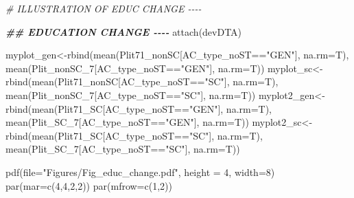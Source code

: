 \documentclass[
]{article}
\newenvironment{Shaded}{\begin{snugshade}}{\end{snugshade}}
\newcommand{\AttributeTok}[1]{\textcolor[rgb]{0.77,0.63,0.00}{#1}}
\newcommand{\CommentTok}[1]{\textcolor[rgb]{0.56,0.35,0.01}{\textit{#1}}}
\newcommand{\DecValTok}[1]{\textcolor[rgb]{0.00,0.00,0.81}{#1}}
\newcommand{\DocumentationTok}[1]{\textcolor[rgb]{0.56,0.35,0.01}{\textbf{\textit{#1}}}}
\newcommand{\FunctionTok}[1]{\textcolor[rgb]{0.00,0.00,0.00}{#1}}
\newcommand{\NormalTok}[1]{#1}
\newcommand{\OtherTok}[1]{\textcolor[rgb]{0.56,0.35,0.01}{#1}}
\newcommand{\SpecialCharTok}[1]{\textcolor[rgb]{0.00,0.00,0.00}{#1}}
\newcommand{\StringTok}[1]{\textcolor[rgb]{0.31,0.60,0.02}{#1}}
\begin{document}
\begin{Shaded}
\begin{Highlighting}[]
\CommentTok{\# ILLUSTRATION OF EDUC CHANGE {-}{-}{-}{-}}

\DocumentationTok{\#\# EDUCATION CHANGE {-}{-}{-}{-}}
\FunctionTok{attach}\NormalTok{(devDTA)}

\NormalTok{myplot\_gen}\OtherTok{\textless{}{-}}\FunctionTok{rbind}\NormalTok{(}\FunctionTok{mean}\NormalTok{(Plit71\_nonSC[AC\_type\_noST}\SpecialCharTok{==}\StringTok{"GEN"}\NormalTok{], }\AttributeTok{na.rm=}\NormalTok{T), }\FunctionTok{mean}\NormalTok{(Plit\_nonSC\_7[AC\_type\_noST}\SpecialCharTok{==}\StringTok{"GEN"}\NormalTok{], }\AttributeTok{na.rm=}\NormalTok{T))}
\NormalTok{myplot\_sc}\OtherTok{\textless{}{-}}\FunctionTok{rbind}\NormalTok{(}\FunctionTok{mean}\NormalTok{(Plit71\_nonSC[AC\_type\_noST}\SpecialCharTok{==}\StringTok{"SC"}\NormalTok{], }\AttributeTok{na.rm=}\NormalTok{T), }\FunctionTok{mean}\NormalTok{(Plit\_nonSC\_7[AC\_type\_noST}\SpecialCharTok{==}\StringTok{"SC"}\NormalTok{], }\AttributeTok{na.rm=}\NormalTok{T))}
\NormalTok{myplot2\_gen}\OtherTok{\textless{}{-}}\FunctionTok{rbind}\NormalTok{(}\FunctionTok{mean}\NormalTok{(Plit71\_SC[AC\_type\_noST}\SpecialCharTok{==}\StringTok{"GEN"}\NormalTok{], }\AttributeTok{na.rm=}\NormalTok{T), }\FunctionTok{mean}\NormalTok{(Plit\_SC\_7[AC\_type\_noST}\SpecialCharTok{==}\StringTok{"GEN"}\NormalTok{], }\AttributeTok{na.rm=}\NormalTok{T))}
\NormalTok{myplot2\_sc}\OtherTok{\textless{}{-}}\FunctionTok{rbind}\NormalTok{(}\FunctionTok{mean}\NormalTok{(Plit71\_SC[AC\_type\_noST}\SpecialCharTok{==}\StringTok{"SC"}\NormalTok{], }\AttributeTok{na.rm=}\NormalTok{T), }\FunctionTok{mean}\NormalTok{(Plit\_SC\_7[AC\_type\_noST}\SpecialCharTok{==}\StringTok{"SC"}\NormalTok{], }\AttributeTok{na.rm=}\NormalTok{T))}

\FunctionTok{pdf}\NormalTok{(}\AttributeTok{file=}\StringTok{"Figures/Fig\_educ\_change.pdf"}\NormalTok{, }\AttributeTok{height =} \DecValTok{4}\NormalTok{, }\AttributeTok{width=}\DecValTok{8}\NormalTok{)}
\FunctionTok{par}\NormalTok{(}\AttributeTok{mar=}\FunctionTok{c}\NormalTok{(}\DecValTok{4}\NormalTok{,}\DecValTok{4}\NormalTok{,}\DecValTok{2}\NormalTok{,}\DecValTok{2}\NormalTok{))}
\FunctionTok{par}\NormalTok{(}\AttributeTok{mfrow=}\FunctionTok{c}\NormalTok{(}\DecValTok{1}\NormalTok{,}\DecValTok{2}\NormalTok{))}


\end{Highlighting}
\end{Shaded}
\end{document}
